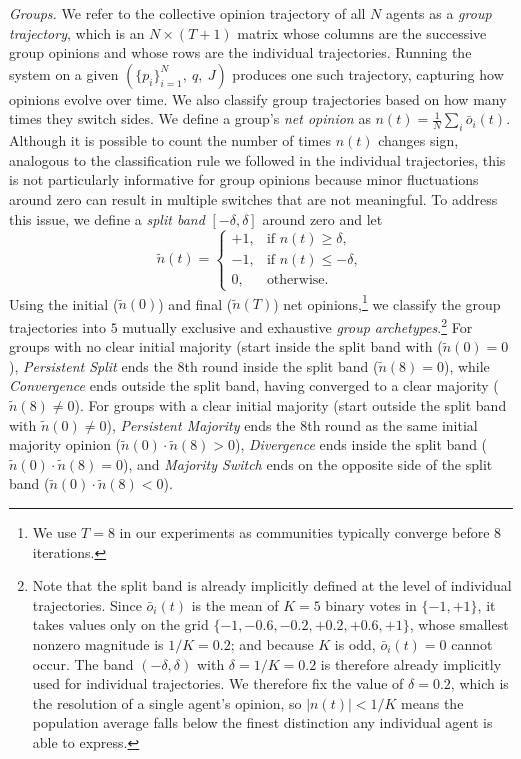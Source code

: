 \textit{Groups.} We refer to the collective opinion trajectory of all $N$ agents as a \textit{group trajectory}, which is an $N \times (T+1)$ matrix whose columns are the successive group opinions and whose rows are the individual trajectories. Running the system on a given $(\{p_i\}_{i=1}^N,\ q,\ J)$ produces one such trajectory, capturing how opinions evolve over time. We also classify group trajectories based on how many times they switch sides. We define a group’s \textit{net opinion} as \(n(t) = \frac{1}{N}\sum_i \bar{o}_i(t)\). Although it is possible to count the number of times \(n(t)\) changes sign, analogous to the classification rule we followed in the individual trajectories, this is not particularly informative for group opinions because minor fluctuations around zero can result in multiple switches that are not meaningful. To address this issue, we define a \textit{split band} \([-\delta, \delta]\) around zero and let
\[
\tilde{n}(t) =
\begin{cases}
+1, & \text{if } n(t) \geq \delta, \\
-1, & \text{if } n(t) \leq -\delta, \\
0,  & \text{otherwise}.
\end{cases}
\]
Using the initial ($\tilde{n}(0)$) and final ($\tilde{n}(T)$) net opinions,\footnote{We use $T=8$ in our experiments as  communities typically converge before 8 iterations.} we classify the group trajectories into $5$ mutually exclusive and exhaustive \textit{group archetypes}.\footnote{Note that the split band is already implicitly defined at the level of individual trajectories. Since
$\bar{o}_i(t)$ is the mean of $K=5$ binary votes in $\{-1,+1\}$, it takes values
only on the grid $\{-1,-0.6,-0.2,+0.2,+0.6,+1\}$, whose smallest nonzero
magnitude is $1/K = 0.2$; and because $K$ is odd, $\bar{o}_i(t)=0$ cannot occur.
The band $(-\delta,\delta)$ with $\delta = 1/K = 0.2$ is therefore already implicitly used
for individual trajectories. We therefore fix the value of $\delta =0.2$, which is the resolution of a single agent's opinion, so
$|n(t)| < 1/K$ means the population average falls below the finest distinction
any individual agent is able to express.} For groups with no clear initial majority (start inside the split band with ($\tilde{n}(0) = 0$), \emph{Persistent Split} ends the 8th round inside the split band ($\tilde{n}(8) = 0$), while \emph{Convergence} ends outside the split band, having converged to a clear majority ($\tilde{n}(8) \neq 0$). For groups with a clear initial majority (start outside the split band with $\tilde{n}(0) \neq 0$), \emph{Persistent Majority} ends the 8th round as the same initial majority opinion ($\tilde{n}(0) \cdot \tilde{n}(8)  > 0$), \emph{Divergence} ends inside the split band ($\tilde{n}(0) \cdot \tilde{n}(8)  = 0$), and \emph{Majority Switch} ends on the opposite side of the split band ($\tilde{n}(0) \cdot \tilde{n}(8)  < 0$).

